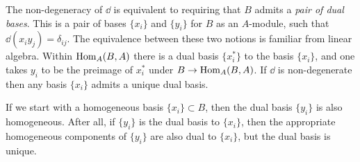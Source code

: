 \begin{remark}\label{rmk-non-degeneracy and dual basis}
The non-degeneracy of $\dd$ is equivalent
to requiring that $B$ admits a \emph{pair of dual bases}. This is a pair of bases
$\{x_i\}$ and $\{y_i\}$ for $B$ as an $A$-module, such that $\dd(x_i y_j)=\delta_{i j}$. The equivalence between these two notions is familiar from linear algebra. 
Within $\operatorname{Hom}_A(B,A)$ there is a dual basis $\{x_i^*\}$ to the basis $\{x_i\}$, and one takes $y_{i}$ to be the preimage of $x_{i}^*$ under $B \to \operatorname{Hom}_A(B,A)$. 
If $\dd$ is non-degenerate then any basis $\{x_{i}\}$ admits a unique dual basis.

If we start with a homogeneous basis $\{x_i\}\subset B$, then the dual basis $\{y_i\}$ is also homogeneous. After all, if $\{y_{i}\}$ is the dual basis to $\{x_{i}\}$, then the appropriate homogeneous components of $\{y_{i}\}$ are also dual to $\{x_{i}\}$, but the dual basis is unique.


    



\end{remark}

